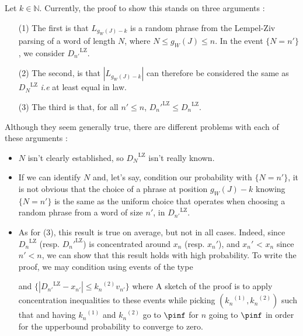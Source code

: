 \noindent
\hypertarget{critics}{}
Let $k \in\mathbb{N}$.
Currently, the proof to show this stands on three arguments :

\begin{itemize}
    \item[(1)] The first is that $L_{g_W(J)-k}$ is  
          a random phrase from the Lempel-Ziv parsing of 
          a word of length $N$, where $N \leq g_W(J) \leq n$.
          In the event $\{ N = n' \}$, we consider 
          ${D_{n'}}^{\text{LZ}}$.

    \item[(2)] The second, is that $|L_{g_W(J)-k}|$ can 
          therefore be considered the same as ${D_N}^{\text{LZ}}$
          \textit{i.e} at least equal in law.

    \item[(3)] The third is that, for all $n'\leq n$, 
        ${D_n'}^{\text{LZ}} \leq {D_n}^{\text{LZ}}$.
\end{itemize}
Although they seem generally true,
there are different problems with each of these arguments :

\begin{itemize}
    \item $N$ isn't clearly established, so 
          ${D_N}^{\text{LZ}}$ isn't really known.

    \item If we can identify $N$ and, let's say,
          condition our probability with $\{ N = n' \}$, 
          it is not obvious
          that the choice of a phrase at position ${g_W(J)-k}$
          knowing $\{ N = n' \}$
          is the same as the uniform choice that operates
          when choosing a random phrase from a word of size
          $n'$, in ${D_{n'}}^{\text{LZ}}$.

    \item As for (3), this result is true on average, but 
          not in all cases. Indeed, since ${D_n}^{\text{LZ}}$
          (resp. ${D_n'}^{\text{LZ}}$) is concentrated
          around $x_n$ (resp. $x_n'$), and $x_n'$ < $x_n$
          since $n' < n$, we can show 
          that this result holds with high probability.
          To write the proof, we may condition using
          events of the type


          \leftcenters
            {and}
            {$\{ | {D_{n'}}^{\text{LZ}} - x_{n'} | \leq {k_n}^{(2)} v_{n'} \} $}
          where 
          \noindent
          A sketch of the proof is to
          apply concentration 
          inequalities to these events 
          while picking $({k_n}^{(1)}, {k_n}^{(2)})$ such that 
          \noindent
          and having ${k_n}^{(1)}$ and ${k_n}^{(2)}$ go to $\pinf$ for 
          $n$ going to $\pinf$ in order for the upperbound probability
          to converge to zero. 
\end{itemize}